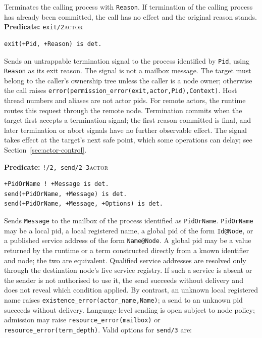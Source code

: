 \noindent Terminates the calling process with \texttt{Reason}. If termination of the calling process has already been committed, the call has no effect and the original reason stands.\\


\noindent \textbf{Predicate:} \texttt{exit/\allowbreak{}2}\hfill\textsc{actor}

\begin{verbatim}
exit(+Pid, +Reason) is det.
\end{verbatim}

\noindent Sends an untrappable termination signal to the process identified by
\texttt{Pid}, using \texttt{Reason} as its exit reason. The signal is not a
mailbox message. The target must belong to the caller's ownership tree unless
the caller is a node owner; otherwise the call raises
\texttt{error(\allowbreak{}permission\_\allowbreak{}error(\allowbreak{}exit,\allowbreak{}actor,\allowbreak{}Pid),\allowbreak{}Context)}. Host thread numbers
and aliases are not actor pids. For remote actors, the runtime routes this request through the
remote node. Termination commits when the target first accepts a termination signal; the first reason committed is final, and later termination or abort signals have no further observable effect. The signal takes effect at the target's next safe point, which some operations can delay; see Section~\ref{sec:actor-control}.\\


\noindent \textbf{Predicate:} \texttt{!/\allowbreak{}2,\allowbreak{} send/\allowbreak{}2-3}\hfill\textsc{actor}

\begin{verbatim}
+PidOrName ! +Message is det.
send(+PidOrName, +Message) is det.
send(+PidOrName, +Message, +Options) is det.
\end{verbatim}

\noindent Sends \texttt{Message} to the mailbox of the process identified as
\texttt{PidOrName}. \texttt{PidOrName} may be a local pid, a local registered
name, a global pid of the form \texttt{Id@Node}, or a published service
address of the form \texttt{Name@Node}. A global pid may be a value returned
by the runtime or a term constructed directly from a known identifier and node;
the two are equivalent. Qualified service addresses are
resolved only through the destination node's live service registry. If such a
service is absent or the sender is not authorised to use it, the send succeeds
without delivery and does not reveal which condition applied. By contrast, an
unknown local registered name raises \texttt{existence\_\allowbreak{}error(\allowbreak{}actor\_\allowbreak{}name,\allowbreak{}Name)};
a send to an unknown pid succeeds without delivery. Language-level sending
is open subject to node policy; admission may raise
\texttt{resource\_\allowbreak{}error(\allowbreak{}mailbox)} or \texttt{resource\_\allowbreak{}error(\allowbreak{}term\_\allowbreak{}depth)}.
Valid options for
\texttt{send/\allowbreak{}3} are:

